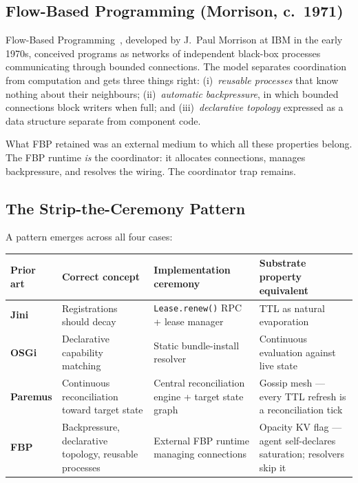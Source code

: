 \documentclass[11pt]{article}
\begin{document}
\subsection{Flow-Based Programming (Morrison, c.~1971)}

Flow-Based Programming~\cite{fbp}, developed by J.~Paul Morrison at IBM in the
early 1970s, conceived programs as networks of independent black-box processes
communicating through bounded connections. The model separates coordination from
computation and gets three things right: (i)~\emph{reusable processes} that know
nothing about their neighbours; (ii)~\emph{automatic backpressure}, in which
bounded connections block writers when full; and (iii)~\emph{declarative topology}
expressed as a data structure separate from component code.

What FBP retained was an external medium to which all these properties belong. The
FBP runtime \emph{is} the coordinator: it allocates connections, manages
backpressure, and resolves the wiring. The coordinator trap remains.

\subsection{The Strip-the-Ceremony Pattern}

A pattern emerges across all four cases:

\begin{center}
\renewcommand{\arraystretch}{1.25}
\begin{tabularx}{\textwidth}{>{\bfseries}lXXX}
\toprule
Prior art & Correct concept & Implementation ceremony & Substrate property equivalent \\
\midrule
Jini & Registrations should decay & \texttt{Lease.renew()} RPC + lease manager & TTL as natural evaporation \\
OSGi & Declarative capability matching & Static bundle-install resolver & Continuous evaluation against live state \\
Paremus & Continuous reconciliation toward target state & Central reconciliation engine + target state graph & Gossip mesh --- every TTL refresh is a reconciliation tick \\
FBP & Backpressure, declarative topology, reusable processes & External FBP runtime managing connections & Opacity KV flag --- agent self-declares saturation; resolvers skip it \\
\bottomrule
\end{tabularx}
\end{center}
\end{document}
